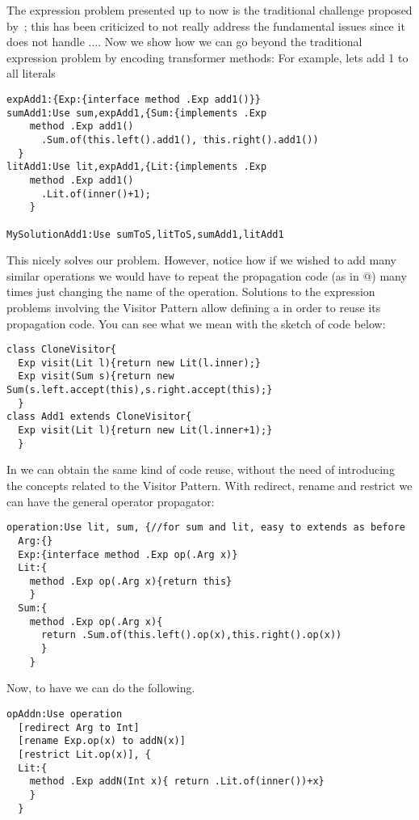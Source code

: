 The expression problem presented up to now is the traditional challenge proposed by~\cite{wadler1998expression};
this has been criticized to not really address the fundamental issues since it does not handle ....
Now we show how we can go beyond the traditional expression problem by encoding transformer methods:
For example, lets add 1 to all literals
\begin{lstlisting}
expAdd1:{Exp:{interface method .Exp add1()}}
sumAdd1:Use sum,expAdd1,{Sum:{implements .Exp
    method .Exp add1()
      .Sum.of(this.left().add1(), this.right().add1())
  }
litAdd1:Use lit,expAdd1,{Lit:{implements .Exp
    method .Exp add1()
      .Lit.of(inner()+1);
    }

MySolutionAdd1:Use sumToS,litToS,sumAdd1,litAdd1
\end{lstlisting}

This nicely solves our problem. 
However, notice how if we wished to add many similar operations we would 
have to repeat the propagation code (as in @) many times
just changing the name of the operation.
Solutions to the expression problems involving the  Visitor Pattern 
allow defining a \Q@CloneVisitor@ in order
to reuse its propagation code.
You can see what we mean with the sketch of code below:
\begin{lstlisting}
class CloneVisitor{
  Exp visit(Lit l){return new Lit(l.inner);}
  Exp visit(Sum s){return new Sum(s.left.accept(this),s.right.accept(this);}
  }
class Add1 extends CloneVisitor{
  Exp visit(Lit l){return new Lit(l.inner+1);}
  }
\end{lstlisting}
In \name we can obtain the same kind of code reuse, without the need of introducing 
the concepts related to the Visitor Pattern.
With redirect, rename and restrict we can have the general operator propagator:
\begin{lstlisting}
operation:Use lit, sum, {//for sum and lit, easy to extends as before
  Arg:{}
  Exp:{interface method .Exp op(.Arg x)}
  Lit:{
    method .Exp op(.Arg x){return this}
    }
  Sum:{
    method .Exp op(.Arg x){
      return .Sum.of(this.left().op(x),this.right().op(x))
      }
    }
\end{lstlisting}

Now, to have \Q@addN@ we can do the following.

\begin{lstlisting}
opAddn:Use operation
  [redirect Arg to Int]
  [rename Exp.op(x) to addN(x)]
  [restrict Lit.op(x)], {
  Lit:{
    method .Exp addN(Int x){ return .Lit.of(inner())+x}
    }
  }
\end{lstlisting}  



